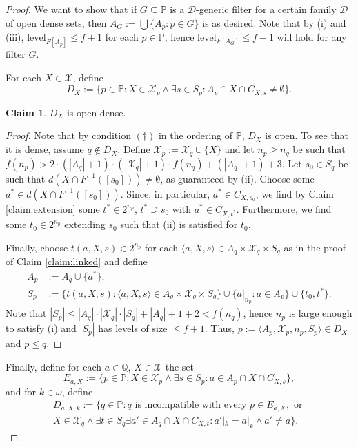 \documentclass[12pt]{article}
\theoremstyle{definition}
\newtheorem{claim}[nummer]{\sc Claim}
\newcommand\level{\text{level}}
\begin{document}
\begin{proof}
We want to show that if $G\subseteq \mathbb{P}$ is a $\mathcal{D}$-generic filter for a certain family $\mathcal{D}$ of open dense sets, then $A_G:=\bigcup \{A_p: p \in G\}$ is as desired. Note that by (i) and (iii), $\level_{F[A_p]}\leq f+1$ for each $p \in \mathbb{P}$, hence $\level_{F[A_G]}\leq f+1$ will hold for any filter $G$.

For each $X \in \mathcal{X}$, define
\[D_X:=\{p \in \mathbb{P}: X \in \mathcal{X}_p \land \exists s \in S_p: A_p \cap X \cap C_{X,s}\neq \emptyset\}.\]

\begin{claim}\label{claim:DX}
$D_X$ is open dense.	
\end{claim}

\begin{proof}
Note that by condition $(\dagger)$ in the ordering of $\mathbb{P}$, $D_X$ is open. To see that it is dense, assume $q \notin D_X$. Define $\mathcal{X}_p:=\mathcal{X}_q \cup \{X\}$ and let $n_p \geq n_q$ be such that $f(n_p)> 2 \cdot (|A_q|+1)\cdot (|\mathcal{X}_q|+1) \cdot f(n_q)+(|A_q|+1)+3$. Let $s_0 \in S_q$ be such that $d(X \cap F^{-1}([s_0]))\neq \emptyset$, as guaranteed by (ii). Choose some $a^{\ast} \in d(X \cap F^{-1}([s_0]))$. Since, in particular, $a^{\ast} \in C_{X,s_0}$, we find by Claim \ref{claim:extension} some $t^{\ast} \in 2^{n_p}$, $t^{\ast} \supseteq s_0$ with $a^{\ast} \in C_{X,t^{\ast}}$. Furthermore, we find some $t_0 \in 2^{n_p}$ extending $s_0$ such that (ii) is satisfied for $t_0$.

Finally, choose $t(a,X,s)\in 2^{n_p}$ for each $\langle a, X, s\rangle \in A_q \times \mathcal{X}_q \times S_q$ as in the proof of Claim \ref{claim:linked} and define
\[\begin{aligned}
	A_p&:=A_q \cup \{a^{\ast}\},\\
	S_p&:=\{t(a,X,s): \langle a, X, s\rangle \in A_q \times \mathcal{X}_q \times S_q\} \cup \{a|_{n_p}: a \in A_p\} \cup \{t_0, t^{\ast}\}.
\end{aligned}\]
Note that $|S_p|\leq |A_q|\cdot |\mathcal{X}_q|\cdot |S_q|+ |A_q|+1 +2 < f(n_q)$, hence $n_p$ is large enough to satisfy (i) and $|S_p|$ has levels of size $\leq f+1$. Thus, $p:=\langle A_p, \mathcal{X}_p, n_p, S_p \rangle \in D_X$ and $p \leq q$.
\end{proof}

Finally, define for each $a \in \mathbb{Q}$, $X \in \mathcal{X}$ the set
\[E_{a,X}:=\{p \in \mathbb{P}: X \in \mathcal{X}_p \land \exists s \in S_p:  a \in A_p \cap X \cap C_{X,s}\},\]
 and for $k \in \omega$, define
\[\begin{aligned}D_{a, X, k}:=\{q \in \mathbb{P}: q \text{ is incompatible with every } p \in E_{a,X}, \text { or } \\
X \in \mathcal{X}_q \land \exists t \in S_q \exists a' \in A_q \cap X \cap C_{X,t}: a'|_k = a|_k \land a' \neq a\}.
\end{aligned}\]


\end{proof}
\end{document}
